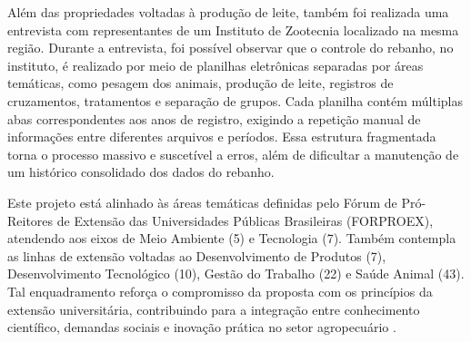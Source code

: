 Além das propriedades voltadas à produção de leite, também foi realizada uma entrevista com representantes de um Instituto de Zootecnia localizado na mesma região. Durante a entrevista, foi possível observar que o controle do rebanho, no instituto, é realizado por meio de planilhas eletrônicas separadas por áreas temáticas, como pesagem dos animais, produção de leite, registros de cruzamentos, tratamentos e separação de grupos. Cada planilha contém múltiplas abas correspondentes aos anos de registro, exigindo a repetição manual de informações entre diferentes arquivos e períodos. Essa estrutura fragmentada torna o processo massivo e suscetível a erros, além de dificultar a manutenção de um histórico consolidado dos dados do rebanho.

Este projeto está alinhado às áreas temáticas definidas pelo Fórum de Pró-Reitores de Extensão das Universidades Públicas Brasileiras (FORPROEX), atendendo aos eixos de Meio Ambiente (5) e Tecnologia (7). Também contempla as linhas de extensão voltadas ao Desenvolvimento de Produtos (7), Desenvolvimento Tecnológico (10), Gestão do Trabalho (22) e Saúde Animal (43). Tal enquadramento reforça o compromisso da proposta com os princípios da extensão universitária, contribuindo para a integração entre conhecimento científico, demandas sociais e inovação prática no setor agropecuário \cite{FORPROEX}.
